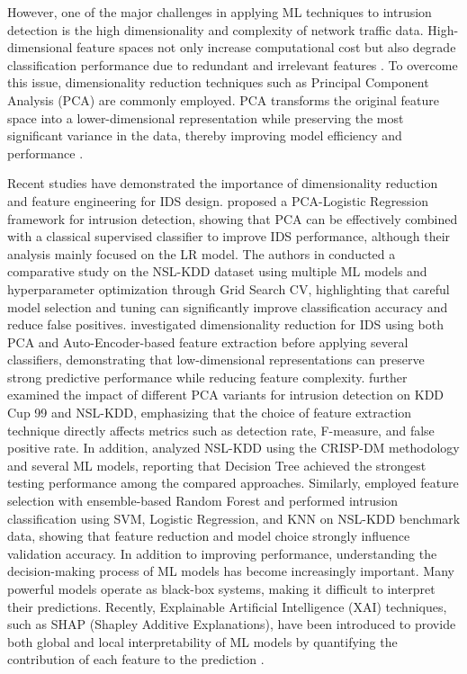 \documentclass[conference]{IEEEtran}
\begin{document}
However, one of the major challenges in applying ML techniques to intrusion detection is the high dimensionality and complexity of network traffic data. High-dimensional feature spaces not only increase computational cost but also degrade classification performance due to redundant and irrelevant features \cite{b6}. To overcome this issue, dimensionality reduction techniques such as Principal Component Analysis (PCA) are commonly employed. PCA transforms the original feature space into a lower-dimensional representation while preserving the most significant variance in the data, thereby improving model efficiency and performance \cite{b7}. 

Recent studies have demonstrated the importance of dimensionality reduction and feature engineering for IDS design. \cite{b12} proposed a PCA-Logistic Regression framework for intrusion detection, showing that PCA can be effectively combined with a classical supervised classifier to improve IDS performance, although their analysis mainly focused on the LR model. The authors in \cite{b13} conducted a comparative study on the NSL-KDD dataset using multiple ML models and hyperparameter optimization through Grid Search CV, highlighting that careful model selection and tuning can significantly improve classification accuracy and reduce false positives. \cite{b14} investigated dimensionality reduction for IDS using both PCA and Auto-Encoder-based feature extraction before applying several classifiers, demonstrating that low-dimensional representations can preserve strong predictive performance while reducing feature complexity. \cite{b15} further examined the impact of different PCA variants for intrusion detection on KDD Cup 99 and NSL-KDD, emphasizing that the choice of feature extraction technique directly affects metrics such as detection rate, F-measure, and false positive rate. In addition, \cite{b16} analyzed NSL-KDD using the CRISP-DM methodology and several ML models, reporting that Decision Tree achieved the strongest testing performance among the compared approaches. Similarly, \cite{b17} employed feature selection with ensemble-based Random Forest and performed intrusion classification using SVM, Logistic Regression, and KNN on NSL-KDD benchmark data, showing that feature reduction and model choice strongly influence validation accuracy.
In addition to improving performance, understanding the decision-making process of ML models has become increasingly important. Many powerful models operate as black-box systems, making it difficult to interpret their predictions. Recently, Explainable Artificial Intelligence (XAI) techniques, such as SHAP (Shapley Additive Explanations), have been introduced to provide both global and local interpretability of ML models by quantifying the contribution of each feature to the prediction \cite{b8}.
\end{document}
